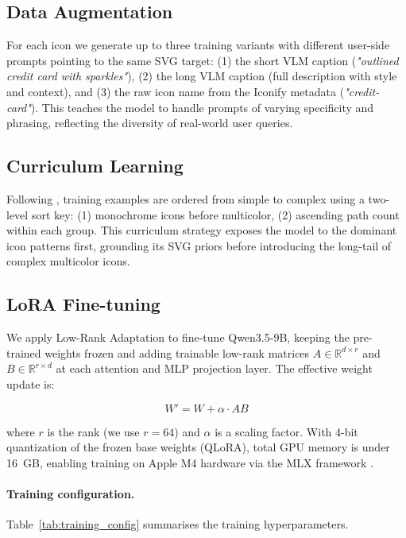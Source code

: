 \subsection{Data Augmentation}

For each icon we generate up to three training variants with different
user-side prompts pointing to the same SVG target:
(1) the short VLM caption (\textit{"outlined credit card with sparkles"}),
(2) the long VLM caption (full description with style and context), and
(3) the raw icon name from the Iconify metadata (\textit{"credit-card"}).
This teaches the model to handle prompts of varying specificity and phrasing,
reflecting the diversity of real-world user queries.

\subsection{Curriculum Learning}
\label{sec:curriculum}

Following \citet{svgen2025}, training examples are ordered from simple to
complex using a two-level sort key: (1) monochrome icons before multicolor,
(2) ascending path count within each group. This curriculum strategy exposes
the model to the dominant icon patterns first, grounding its SVG priors before
introducing the long-tail of complex multicolor icons.

\subsection{LoRA Fine-tuning}
\label{sec:lora}

We apply Low-Rank Adaptation \citep{hu2022lora} to fine-tune Qwen3.5-9B,
keeping the pre-trained weights frozen and adding trainable low-rank matrices
$A \in \mathbb{R}^{d \times r}$ and $B \in \mathbb{R}^{r \times d}$ at each
attention and MLP projection layer. The effective weight update is:

\[
W' = W + \alpha \cdot A B
\]

where $r$ is the rank (we use $r = 64$) and $\alpha$ is a scaling factor.
With 4-bit quantization of the frozen base weights (QLoRA), total GPU memory
is under 16~GB, enabling training on Apple M4 hardware via the MLX framework
\citep{mlx2023}.

\paragraph{Training configuration.}
Table~\ref{tab:training_config} summarises the training hyperparameters.

